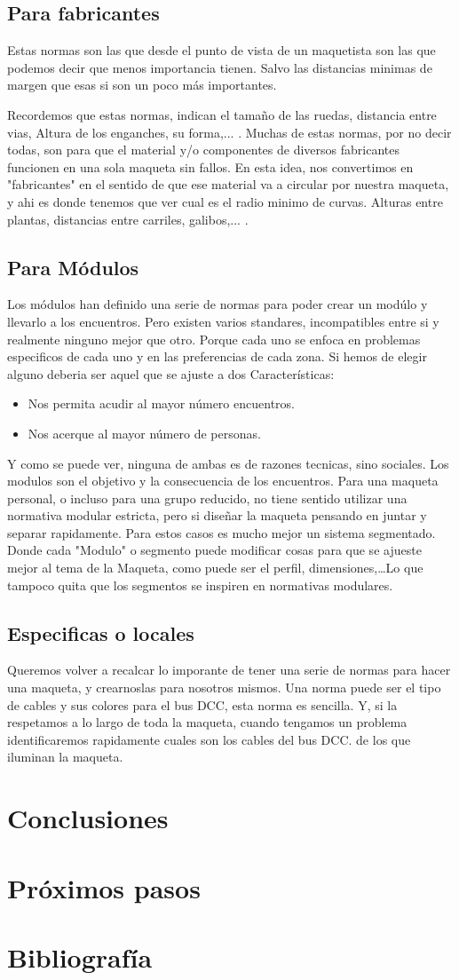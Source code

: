 \subsection{Para fabricantes}
Estas normas son las que desde el punto de vista de un maquetista son las que podemos decir que menos importancia tienen. Salvo las distancias minimas de margen que esas si son un poco más importantes.

Recordemos que estas normas, indican el tamaño de las ruedas, distancia entre vias, Altura de los enganches, su forma,... . Muchas de estas normas, por no decir todas, son para que el material y/o componentes de diversos fabricantes funcionen en una sola maqueta sin fallos. En esta idea, nos convertimos en "fabricantes" en el sentido de que ese material va a circular por nuestra maqueta, y ahi es donde tenemos que ver cual es el radio minimo de curvas.
Alturas entre plantas, distancias entre carriles, galibos,... .
\subsection{Para Módulos}
Los módulos han definido una serie de normas para poder crear un modúlo y llevarlo a los encuentros. Pero existen varios standares, incompatibles entre si y realmente ninguno mejor que otro. Porque cada uno se enfoca en problemas especificos de cada uno y en las preferencias de cada zona. Si hemos de elegir alguno deberia ser aquel que se ajuste a dos Características:
\begin{itemize}
	\item Nos permita acudir al mayor número encuentros.
	\item Nos acerque al mayor número de personas.
\end{itemize} 
Y como se puede ver, ninguna de ambas es de razones tecnicas, sino sociales. Los modulos son el objetivo y la consecuencia de los encuentros. Para una maqueta personal, o incluso para una grupo reducido, no tiene sentido utilizar una normativa modular estricta, pero si diseñar la maqueta pensando en juntar y separar rapidamente. Para estos casos es mucho mejor un sistema segmentado. Donde cada "Modulo" o segmento puede modificar cosas para que se ajueste mejor al tema de la Maqueta, como puede ser el perfil, dimensiones,\dots Lo que tampoco quita que los segmentos se inspiren en normativas modulares.
\subsection{Especificas o locales}
Queremos volver a recalcar lo imporante de tener una serie de normas para hacer una maqueta, y crearnoslas para nosotros mismos. Una norma puede ser el tipo de cables y sus colores para el bus DCC, esta norma es sencilla. Y, si la respetamos a lo largo de toda la maqueta, cuando tengamos un problema identificaremos rapidamente cuales son los cables del bus DCC. de los que iluminan la maqueta.
\section{Conclusiones}\section{Próximos pasos}

\section{Bibliografía}
\printbibliography[heading=subbibliography]
